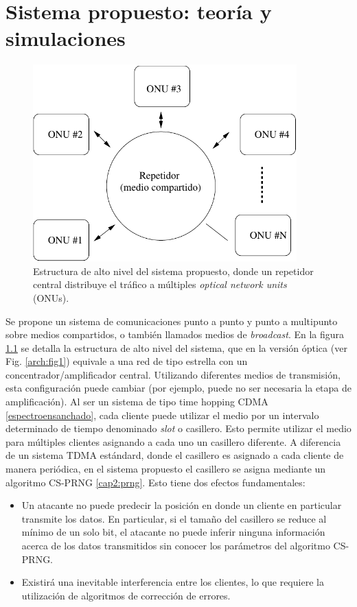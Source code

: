 \chapter{Sistema propuesto: teoría y simulaciones}

\begin{figure}[t]
\centering
\includegraphics[width=4in]{graphs/hub}
\caption{Estructura de alto nivel del sistema propuesto, donde un repetidor central distribuye el tráfico a múltiples \textit{optical network units} (ONUs).}
\label{fig_hub}
\end{figure}

Se propone un sistema de comunicaciones punto a punto y punto a multipunto sobre medios compartidos, o también llamados medios de \textit{broadcast}. En la figura \ref{fig_hub} se detalla la estructura de alto nivel del sistema, que en la versión óptica (ver Fig. \ref{arch:fig1}) equivale a una red de tipo estrella con un concentrador/amplificador central. Utilizando diferentes medios de transmisión, esta configuración puede cambiar (por ejemplo, puede no ser necesaria la etapa de amplificación).
Al ser un sistema de tipo time hopping CDMA \ref{espectroensanchado}, cada cliente puede utilizar el medio por un intervalo determinado de tiempo denominado \textit{slot} o casillero. Esto permite utilizar el medio para múltiples clientes asignando a cada uno un casillero diferente. A diferencia de un sistema TDMA estándard, donde el casillero es asignado a cada cliente de manera periódica, en el sistema propuesto el casillero se asigna mediante un algoritmo CS-PRNG \ref{cap2:prng}. Esto tiene dos efectos fundamentales: 

\begin{itemize}
 \item Un atacante no puede predecir la posición en donde un cliente en particular transmite los datos. En particular, si el tamaño del casillero se reduce al mínimo de un solo bit, el atacante no puede inferir ninguna información acerca de los datos transmitidos sin conocer los parámetros del algoritmo CS-PRNG.
 \item Existirá una inevitable interferencia entre los clientes, lo que requiere la utilización de algoritmos de corrección de errores.
\end{itemize}

